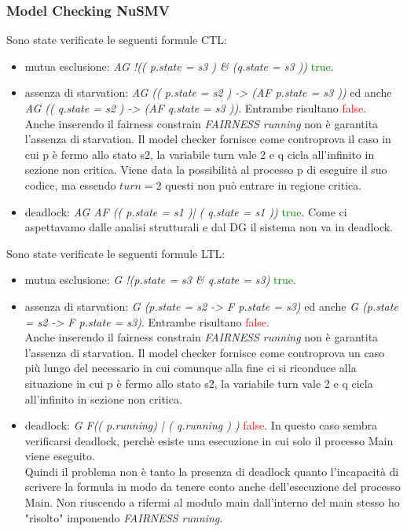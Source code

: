 \documentclass[a4paper]{article}
\begin{document}
\subsubsection{Model Checking NuSMV}
Sono state verificate le seguenti formule CTL:
\begin{itemize}
        \item mutua esclusione: \textit{AG !(( p.state = s3 ) \& (q.state = s3 ))} \textcolor{green}{true}.
        \item assenza di starvation: \textit{AG (( p.state = s2 ) -> (AF p.state = s3 ))} ed anche \textit{AG (( q.state = s2 ) -> (AF q.state = s3 ))}. Entrambe risultano \textcolor{red}{false}.\\
                Anche inserendo il fairness constrain \textit{FAIRNESS running} non è garantita l'assenza di starvation. Il model checker fornisce come controprova il caso in cui p è fermo allo stato s2, la variabile turn vale 2 e q cicla all'infinito in sezione non critica. Viene data la possibilità al processo p di eseguire il suo codice, ma essendo $turn = 2$ questi non può entrare in regione critica.
        \item deadlock: \textit{AG AF (( p.state = s1 )| ( q.state = s1 ))} \textcolor{green}{true}. Come ci aspettavamo dalle analisi strutturali e dal DG il sistema non va in deadlock.
\end{itemize}
Sono state verificate le seguenti formule LTL:
\begin{itemize}
        \item mutua esclusione: \textit{G !(p.state = s3 \& q.state = s3)} \textcolor{green}{true}.
        \item assenza di starvation: \textit{G (p.state = s2 ->  F p.state = s3)} ed anche \textit{G (p.state = s2 ->  F p.state = s3)}. Entrambe risultano \textcolor{red}{false}.\\
		Anche inserendo il fairness constrain \textit{FAIRNESS running} non è garantita l'assenza di starvation. Il model checker fornisce come controprova un caso più lungo del necessario in cui comunque alla fine ci si riconduce alla situazione in cui p è fermo allo stato s2, la variabile turn vale 2 e q cicla all'infinito in sezione non critica.
        \item deadlock: \textit{G F(( p.running) | ( q.running ) )} \textcolor{red}{false}. In questo caso sembra verificarsi deadlock, perchè esiste una esecuzione in cui solo il processo Main viene eseguito.\\
		Quindi il problema non è tanto la presenza di deadlock quanto l'incapacità di scrivere la formula in modo da tenere conto anche dell'esecuzione del processo Main. Non riuscendo a rifermi al modulo main dall'interno del main stesso ho "risolto" imponendo \textit{FAIRNESS running}.
\end{itemize}
\end{document}
